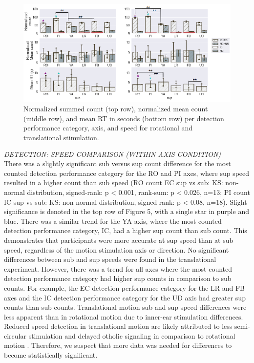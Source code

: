 \documentclass{ieeeaccess}
\begin{document}
\begin{figure}[htp]
\begin{center}
\includegraphics[width=1.0\linewidth]{figures/figure5.eps}
\end{center}
\caption{Normalized summed count (top row), normalized mean count (middle row), and mean RT in seconds (bottom row) per detection performance category, axis, and speed for rotational and translational stimulation.}
\label{fig5}
\end{figure}

\noindent \emph{DETECTION: SPEED COMPARISON (WITHIN AXIS CONDITION)}\\
There was a slightly significant sub versus sup count difference for the most counted detection performance category for the RO and PI axes, where sup speed resulted in a higher count than sub speed (RO count EC sup vs sub: KS: non-normal distribution, signed-rank: p < 0.001, rank-sum: p < 0.026, n=13; PI count IC sup vs sub: KS: non-normal distribution, signed-rank: p < 0.08, n=18). Slight significance is denoted in the top row of Figure 5, with a single star in purple and blue. There was a similar trend for the YA axis, where the most counted detection performance category, IC, had a higher sup count than sub count. This demonstrates that participants were more accurate at sup speed than at sub speed, regardless of the motion stimulation axis or direction. No significant differences between sub and sup speeds were found in the translational experiment. However, there was a trend for all axes where the most counted detection performance category had higher sup counts in comparison to sub counts. For example, the EC detection performance category for the LR and FB axes and the IC detection performance category for the UD axis had greater sup counts than sub counts. Translational motion sub and sup speed differences were less apparent than in rotational motion due to inner-ear stimulation differences. Reduced speed detection in translational motion are likely attributed to less semi-circular stimulation and delayed otholic signaling in comparison to rotational motion \cite{Angelaki_2008_Vestibular}. Therefore, we suspect that more data was needed for differences to become statistically significant.
\end{document}
